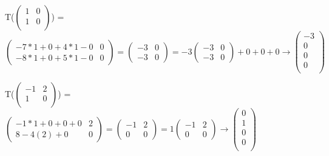 \documentclass[12pt]{article}
\begin{document}
\begin{enumerate}
    T($\begin{pmatrix}
        1 & 0 \\
        1 & 0 \\
    \end{pmatrix}$) = $\begin{pmatrix}
        -7*1 + 0 + 4*1 - 0 & 0 \\
        -8*1 + 0 + 5*1 - 0 & 0
    \end{pmatrix} = \begin{pmatrix}
        -3 & 0 \\
        -3 & 0
    \end{pmatrix} = -3\begin{pmatrix}
        -3 & 0 \\
        -3 & 0
    \end{pmatrix} + 0 + 0 + 0 \rightarrow \begin{pmatrix}
        -3 \\
        0 \\
        0\\
        0\\
    \end{pmatrix}$

    T($\begin{pmatrix}
        -1 & 2 \\
        1 & 0 \\
    \end{pmatrix}$) = $\begin{pmatrix}
        -1*1 + 0 + 0 + 0 & 2 \\
        8  - 4(2) + 0 & 0
    \end{pmatrix} = \begin{pmatrix}
        -1 & 2 \\
        0 & 0
    \end{pmatrix} = 1\begin{pmatrix}
        -1 & 2 \\
        0 & 0
    \end{pmatrix} \rightarrow \begin{pmatrix}
        0 \\
        1 \\
        0\\
        0\\
    \end{pmatrix}$


\end{enumerate}
\end{document}
